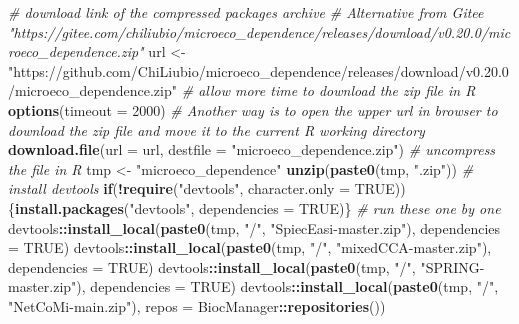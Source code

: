 \documentclass[
]{book}
\newenvironment{Shaded}{\begin{snugshade}}{\end{snugshade}}
\newcommand{\AttributeTok}[1]{\textcolor[rgb]{0.13,0.29,0.53}{#1}}
\newcommand{\CommentTok}[1]{\textcolor[rgb]{0.56,0.35,0.01}{\textit{#1}}}
\newcommand{\ConstantTok}[1]{\textcolor[rgb]{0.56,0.35,0.01}{#1}}
\newcommand{\ControlFlowTok}[1]{\textcolor[rgb]{0.13,0.29,0.53}{\textbf{#1}}}
\newcommand{\DecValTok}[1]{\textcolor[rgb]{0.00,0.00,0.81}{#1}}
\newcommand{\FunctionTok}[1]{\textcolor[rgb]{0.13,0.29,0.53}{\textbf{#1}}}
\newcommand{\NormalTok}[1]{#1}
\newcommand{\OtherTok}[1]{\textcolor[rgb]{0.56,0.35,0.01}{#1}}
\newcommand{\SpecialCharTok}[1]{\textcolor[rgb]{0.81,0.36,0.00}{\textbf{#1}}}
\newcommand{\StringTok}[1]{\textcolor[rgb]{0.31,0.60,0.02}{#1}}
\begin{document}
\begin{Shaded}
\begin{Highlighting}[]
\CommentTok{\# download link of the compressed packages archive}
\CommentTok{\# Alternative from Gitee "https://gitee.com/chiliubio/microeco\_dependence/releases/download/v0.20.0/microeco\_dependence.zip"}
\NormalTok{url }\OtherTok{\textless{}{-}} \StringTok{"https://github.com/ChiLiubio/microeco\_dependence/releases/download/v0.20.0/microeco\_dependence.zip"}
\CommentTok{\# allow more time to download the zip file in R}
\FunctionTok{options}\NormalTok{(}\AttributeTok{timeout =} \DecValTok{2000}\NormalTok{)}
\CommentTok{\# Another way is to open the upper url in browser to download the zip file and move it to the current R working directory}
\FunctionTok{download.file}\NormalTok{(}\AttributeTok{url =}\NormalTok{ url, }\AttributeTok{destfile =} \StringTok{"microeco\_dependence.zip"}\NormalTok{)}
\CommentTok{\# uncompress the file in R}
\NormalTok{tmp }\OtherTok{\textless{}{-}} \StringTok{"microeco\_dependence"}
\FunctionTok{unzip}\NormalTok{(}\FunctionTok{paste0}\NormalTok{(tmp, }\StringTok{".zip"}\NormalTok{))}
\CommentTok{\# install devtools}
\ControlFlowTok{if}\NormalTok{(}\SpecialCharTok{!}\FunctionTok{require}\NormalTok{(}\StringTok{"devtools"}\NormalTok{, }\AttributeTok{character.only =} \ConstantTok{TRUE}\NormalTok{))\{}\FunctionTok{install.packages}\NormalTok{(}\StringTok{"devtools"}\NormalTok{, }\AttributeTok{dependencies =} \ConstantTok{TRUE}\NormalTok{)\}}
\CommentTok{\# run these one by one}
\NormalTok{devtools}\SpecialCharTok{::}\FunctionTok{install\_local}\NormalTok{(}\FunctionTok{paste0}\NormalTok{(tmp, }\StringTok{"/"}\NormalTok{, }\StringTok{"SpiecEasi{-}master.zip"}\NormalTok{), }\AttributeTok{dependencies =} \ConstantTok{TRUE}\NormalTok{)}
\NormalTok{devtools}\SpecialCharTok{::}\FunctionTok{install\_local}\NormalTok{(}\FunctionTok{paste0}\NormalTok{(tmp, }\StringTok{"/"}\NormalTok{, }\StringTok{"mixedCCA{-}master.zip"}\NormalTok{), }\AttributeTok{dependencies =} \ConstantTok{TRUE}\NormalTok{)}
\NormalTok{devtools}\SpecialCharTok{::}\FunctionTok{install\_local}\NormalTok{(}\FunctionTok{paste0}\NormalTok{(tmp, }\StringTok{"/"}\NormalTok{, }\StringTok{"SPRING{-}master.zip"}\NormalTok{), }\AttributeTok{dependencies =} \ConstantTok{TRUE}\NormalTok{)}
\NormalTok{devtools}\SpecialCharTok{::}\FunctionTok{install\_local}\NormalTok{(}\FunctionTok{paste0}\NormalTok{(tmp, }\StringTok{"/"}\NormalTok{, }\StringTok{"NetCoMi{-}main.zip"}\NormalTok{), }\AttributeTok{repos =}\NormalTok{ BiocManager}\SpecialCharTok{::}\FunctionTok{repositories}\NormalTok{())}

\end{Highlighting}
\end{Shaded}
\end{document}
